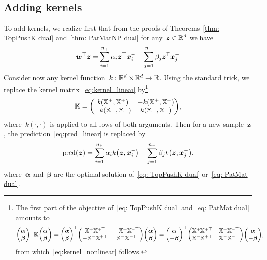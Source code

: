 \subsection{Adding kernels}

To add kernels, we realize first that from the proofs of Theorems~\ref{thm: TopPushK dual} and~\ref{thm: PatMatNP dual} for any~$\bm{z}\in\mathbb{R}^d$ we have
\begin{equation}\label{eq:pred_linear}
  \bm{w}^\top \bm{z} = \sum_{i = 1}^{n_{+}} \alpha_i \bm{z}^\top \bm{x}^+_i - \sum_{j = 1}^{n_{-}} \beta_j \bm{z}^\top \bm{x}^-_j
\end{equation}
Consider now any kernel function~$k:\mathbb{R}^d\times\mathbb{R}^d\to\mathbb{R}$. Using the standard trick, we replace the kernel matrix~\eqref{eq:kernel_linear} by\footnote{
The first part of the objective of~\eqref{eq: TopPushK dual} and~\eqref{eq: PatMat dual} amounts to
\begin{equation*}
  \Matrix{\bm{\alpha} \\ \bm{\beta}}^\top \K \Matrix{\bm{\alpha} \\ \bm{\beta}}
  = \Matrix{\bm{\alpha} \\ \bm{\beta}}^\top \Matrix{\X^+ \X^{+\top} & -\X^+ \X^{-\top} \\ -\X^- \X^{+\top} & \X^- \X^{-\top} }\Matrix{\bm{\alpha} \\ \bm{\beta}}
  = \Matrix{\bm{\alpha} \\ -\bm{\beta}}^\top \Matrix{\X^+ \X^{+\top} & \X^+ \X^{-\top} \\ \X^- \X^{+\top} & \X^- \X^{-\top} }\Matrix{\bm{\alpha} \\ -\bm{\beta}},
\end{equation*}
from which~\eqref{eq:kernel_nonlinear} follows.}
\begin{equation}\label{eq:kernel_nonlinear}
  \K = \Matrix{k(\X^+, \X^{+}) & -k(\X^+, \X^{-}) \\ -k(\X^-, \X^{+}) & k(\X^-, \X^{-}) },
\end{equation}
where~$k(\cdot,\cdot)$ is applied to all rows of both arguments. Then for a new sample~$\bm{z}$, the prediction~\eqref{eq:pred_linear} is replaced by
\begin{equation}\label{eq:pred_nonlinear}
  \textrm{pred}(\bm{z}) = \sum_{i = 1}^{\npos} \alpha_i k\left(\bm{z}, \bm{x}^+_i\right) - \sum_{j = 1}^{\nneg} \beta_j k\left(\bm{z}, \bm{x}^-_j\right),
\end{equation}
where~$\bm{\alpha}$ and~$\bm{\beta}$ are the optimal solution of~\eqref{eq: TopPushK dual} or~\eqref{eq: PatMat dual}.

